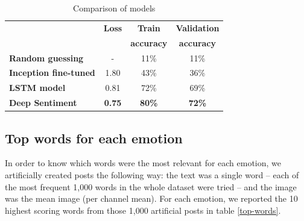 \documentclass{article} %
\begin{document}
\begin{table}[H]
\caption{Comparison of models}
\begin{center}
    \begin{tabular}{ l | c | c | c}
    & \textbf{Loss} & \textbf{Train} & \textbf{Validation} \\
    & & \textbf{accuracy} & \textbf{accuracy} \\ \hline
    \textbf{Random guessing} & - & 11\% & 11\% \\ \hline
    \textbf{Inception fine-tuned}  & 1.80 & 43\% & 36\% \\ \hline
    \textbf{LSTM model} & 0.81 & 72\% & 69\% \\ \hline
    \textbf{Deep Sentiment} & \textbf{0.75} & \textbf{80\%} & \textbf{72\%} \\
    \end{tabular}
\end{center} 
\label{all-results}
\end{table}

\subsection{Top words for each emotion}
In order to know which words were the most relevant for each emotion, we artificially created posts the following way: the text was a single word -- each of the most frequent 1,000 words in the whole dataset were tried -- and the image was the mean image (per channel mean). For each emotion, we reported the 10 highest scoring words from those 1,000 artificial posts in table \ref{top-words}.
\end{document}
